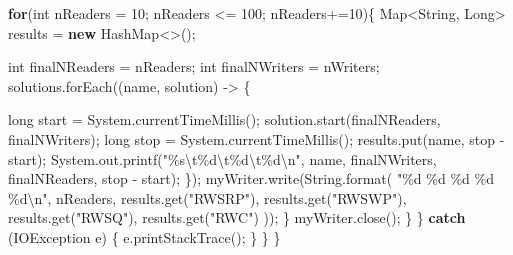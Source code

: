 \documentclass[
]{article}
\newenvironment{Shaded}{\begin{snugshade}}{\end{snugshade}}
\newcommand{\BuiltInTok}[1]{#1}
\newcommand{\DataTypeTok}[1]{\textcolor[rgb]{0.13,0.29,0.53}{#1}}
\newcommand{\DecValTok}[1]{\textcolor[rgb]{0.00,0.00,0.81}{#1}}
\newcommand{\FunctionTok}[1]{\textcolor[rgb]{0.00,0.00,0.00}{#1}}
\newcommand{\KeywordTok}[1]{\textcolor[rgb]{0.13,0.29,0.53}{\textbf{#1}}}
\newcommand{\NormalTok}[1]{#1}
\newcommand{\SpecialCharTok}[1]{\textcolor[rgb]{0.00,0.00,0.00}{#1}}
\newcommand{\StringTok}[1]{\textcolor[rgb]{0.31,0.60,0.02}{#1}}
\begin{document}
\begin{Shaded}
\begin{Highlighting}[]
                \KeywordTok{for}\NormalTok{(}\DataTypeTok{int}\NormalTok{ nReaders = }\DecValTok{10}\NormalTok{; nReaders \textless{}= }\DecValTok{100}\NormalTok{; nReaders+=}\DecValTok{10}\NormalTok{)\{}
                    \BuiltInTok{Map}\NormalTok{\textless{}}\BuiltInTok{String}\NormalTok{, }\BuiltInTok{Long}\NormalTok{\textgreater{} results = }\KeywordTok{new} \BuiltInTok{HashMap}\NormalTok{\textless{}\textgreater{}();}

                    \DataTypeTok{int}\NormalTok{ finalNReaders = nReaders;}
                    \DataTypeTok{int}\NormalTok{ finalNWriters = nWriters;}
\NormalTok{                    solutions.}\FunctionTok{forEach}\NormalTok{((name, solution) {-}\textgreater{} \{}

                        \DataTypeTok{long}\NormalTok{ start = }\BuiltInTok{System}\NormalTok{.}\FunctionTok{currentTimeMillis}\NormalTok{();}
\NormalTok{                        solution.}\FunctionTok{start}\NormalTok{(finalNReaders, finalNWriters);}
                        \DataTypeTok{long}\NormalTok{ stop = }\BuiltInTok{System}\NormalTok{.}\FunctionTok{currentTimeMillis}\NormalTok{();}
\NormalTok{                        results.}\FunctionTok{put}\NormalTok{(name, stop {-} start);}
                        \BuiltInTok{System}\NormalTok{.}\FunctionTok{out.printf}\NormalTok{(}\StringTok{"}\SpecialCharTok{\%s\textbackslash{}t\%d\textbackslash{}t\%d\textbackslash{}t\%d\textbackslash{}n}\StringTok{"}\NormalTok{, name, finalNWriters, finalNReaders, stop {-} start);}
\NormalTok{                    \});}
\NormalTok{                    myWriter.}\FunctionTok{write}\NormalTok{(}\BuiltInTok{String}\FunctionTok{.format}\NormalTok{(}
                            \StringTok{"}\SpecialCharTok{\%d}\StringTok{ }\SpecialCharTok{\%d}\StringTok{ }\SpecialCharTok{\%d}\StringTok{ }\SpecialCharTok{\%d}\StringTok{ }\SpecialCharTok{\%d\textbackslash{}n}\StringTok{"}\NormalTok{,}
\NormalTok{                            nReaders,}
\NormalTok{                            results.}\FunctionTok{get}\NormalTok{(}\StringTok{"RWSRP"}\NormalTok{),}
\NormalTok{                            results.}\FunctionTok{get}\NormalTok{(}\StringTok{"RWSWP"}\NormalTok{),}
\NormalTok{                            results.}\FunctionTok{get}\NormalTok{(}\StringTok{"RWSQ"}\NormalTok{),}
\NormalTok{                            results.}\FunctionTok{get}\NormalTok{(}\StringTok{"RWC"}\NormalTok{)}
\NormalTok{                    ));}
\NormalTok{                \}}
\NormalTok{                myWriter.}\FunctionTok{close}\NormalTok{();}
\NormalTok{            \}}
\NormalTok{        \} }\KeywordTok{catch}\NormalTok{ (}\BuiltInTok{IOException}\NormalTok{ e) \{}
\NormalTok{            e.}\FunctionTok{printStackTrace}\NormalTok{();}
\NormalTok{        \}}
\NormalTok{    \}}
\NormalTok{\}}
\end{Highlighting}
\end{Shaded}
\end{document}
